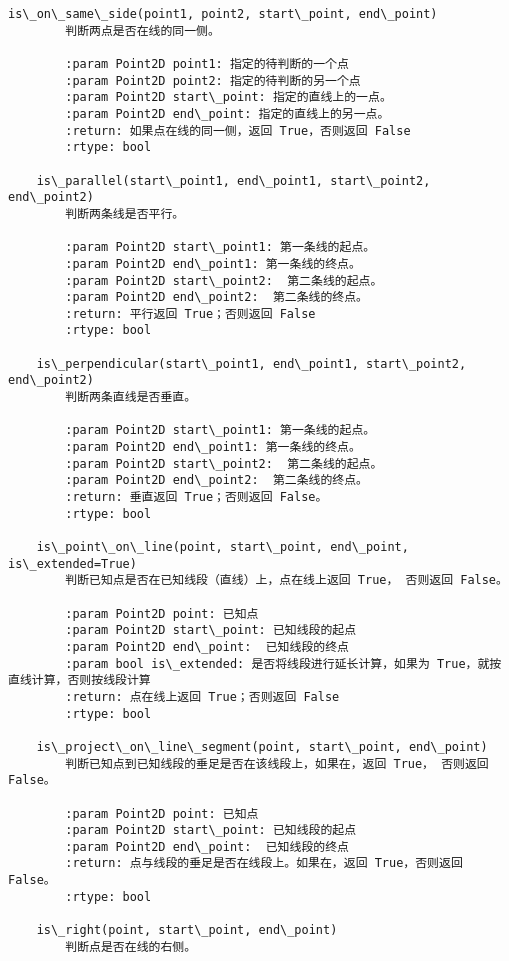 \documentclass[11pt]{article}
\begin{document}
\begin{Verbatim}[commandchars=\\\{\}]
    is\_on\_same\_side(point1, point2, start\_point, end\_point)
        判断两点是否在线的同一侧。
        
        :param Point2D point1: 指定的待判断的一个点
        :param Point2D point2: 指定的待判断的另一个点
        :param Point2D start\_point: 指定的直线上的一点。
        :param Point2D end\_point: 指定的直线上的另一点。
        :return: 如果点在线的同一侧，返回 True，否则返回 False
        :rtype: bool
    
    is\_parallel(start\_point1, end\_point1, start\_point2, end\_point2)
        判断两条线是否平行。
        
        :param Point2D start\_point1: 第一条线的起点。
        :param Point2D end\_point1: 第一条线的终点。
        :param Point2D start\_point2:  第二条线的起点。
        :param Point2D end\_point2:  第二条线的终点。
        :return: 平行返回 True；否则返回 False
        :rtype: bool
    
    is\_perpendicular(start\_point1, end\_point1, start\_point2, end\_point2)
        判断两条直线是否垂直。
        
        :param Point2D start\_point1: 第一条线的起点。
        :param Point2D end\_point1: 第一条线的终点。
        :param Point2D start\_point2:  第二条线的起点。
        :param Point2D end\_point2:  第二条线的终点。
        :return: 垂直返回 True；否则返回 False。
        :rtype: bool
    
    is\_point\_on\_line(point, start\_point, end\_point, is\_extended=True)
        判断已知点是否在已知线段（直线）上，点在线上返回 True， 否则返回 False。
        
        :param Point2D point: 已知点
        :param Point2D start\_point: 已知线段的起点
        :param Point2D end\_point:  已知线段的终点
        :param bool is\_extended: 是否将线段进行延长计算，如果为 True，就按直线计算，否则按线段计算
        :return: 点在线上返回 True；否则返回 False
        :rtype: bool
    
    is\_project\_on\_line\_segment(point, start\_point, end\_point)
        判断已知点到已知线段的垂足是否在该线段上，如果在，返回 True， 否则返回 False。
        
        :param Point2D point: 已知点
        :param Point2D start\_point: 已知线段的起点
        :param Point2D end\_point:  已知线段的终点
        :return: 点与线段的垂足是否在线段上。如果在，返回 True，否则返回 False。
        :rtype: bool
    
    is\_right(point, start\_point, end\_point)
        判断点是否在线的右侧。
        

\end{Verbatim}
\end{document}
